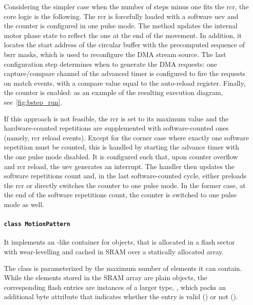 Considering the simpler case when the number of steps minus one fits the \ac{rcr}, the core logic is the following.
The \ac{rcr} is forcefully loaded with a software \ac{uev} and the counter is configured in one pulse mode.
The  method updates the internal motor phase state to reflect the one at the end of the movement. In addition, it locates the start address of the circular buffer with the precomputed sequence of \ac{bsrr} masks, which is used to reconfigure the DMA stream source. The last configuration step determines when to generate the DMA requests: one capture/compare channel of the advanced timer is configured to fire the requests on match events, with a compare value equal to the auto-reload register. Finally, the counter is enabled: as an example of the resulting execution diagram, see~\cref{fig:bstep_run}. 

If this approach is not feasible, the \ac{rcr} is set to its maximum value and the hardware-counted repetitions are supplemented with software-counted ones (namely, \ac{rcr} reload events). Except for the corner case where exactly one software repetition must be counted, this is handled by starting the advance timer with the one pulse mode disabled. It is configured such that, upon counter overflow and \ac{rcr} reload, the \ac{uev} generates an interrupt. The handler then updates the software repetitions count and, in the last software-counted cycle, either preloads the \ac{rcr} or directly switches the counter to one pulse mode. In the former case, at the end of the software repetitions count, the counter is switched to one pulse mode as well.

\paragraph{\texttt{class MotionPattern}}

It implements an -like container for  objects, that is allocated in a flash sector with wear-levelling and cached in SRAM over a statically allocated array.

The class is parameterized by the maximum number of elements it can contain.
While the elements stored in the SRAM array are plain  objects, the corresponding flash entries are instances of a larger type, , which packs an additional byte attribute that indicates whether the entry is valid () or not ().

